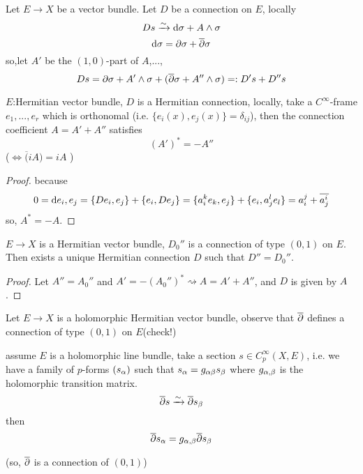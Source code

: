 
\begin{rem}Let $E\to X$ be a %
vector bundle.
Let $D$ be a connection on $E$, locally
$$Ds\xrightarrow{\sim}\mathrm{d}\sigma+A\wedge\sigma$$
$$\mathrm{d}\sigma=\partial\sigma+\overline{\partial}\sigma$$
so,let $A'$ be the $(1,0)$-part of $A$,...,
$$Ds=\partial\sigma+A'\wedge\sigma+(\overline{\partial}\sigma+A''\wedge\sigma)=:D's+D''s$$
\end{rem}

\begin{prop}
$E$:Hermitian vector bundle, $D$ is a Hermitian connection, locally,
take a $C^\infty$-frame $e_1,...,e_r$ which is orthonomal
(i.e. $\{e_i(x),e_j(x)\}=\delta_{ij}$), then the  connection coefficient
$A=A'+A''$ satisfies
$$(A')^*=-A''$$
($\iff \overline(iA)=iA$ )
\end{prop}

\begin{proof}
because
$$0=\mathrm{d}{e_i,e_j}=\{De_i,e_j\}+\{e_i,De_j\}
=\{a_i^ke_k,e_j\}+\{e_i,a_j^le_l\}
=a^j_i+\overline{a^i_j}$$
so, $A^*=-A$.
\end{proof}

\begin{cor}
$E\to X$ is a Hermitian vector bundle,
$D_0''$ is a connection of type $(0,1)$ on $E$.
Then exists a unique Hermitian connection $D$
such that $D''=D_0''$.
\end{cor}

\begin{proof}
Let $A''=A_0''$ and $A'=-(A_0'')^*\rightsquigarrow A=A'+A''$, and
$D$ is given by $A$.
\end{proof}

Let $E\to X$ is a holomorphic Hermitian vector bundle,
observe that $\overline{\partial}$ defines a connection of type $(0,1)$ on $E$(check!)

assume $E$ is a holomorphic line bundle, take a section
$s\in C_p^\infty(X,E)$, i.e. we have a family of $p$-forms $(s_\alpha)$
such that $s_\alpha=g_{\alpha\beta}s_\beta$
where $g_{\alpha,\beta}$ is the holomorphic transition matrix.
$$\overline{\partial} s\xrightarrow{\sim}\overline{\partial} s_\beta$$
then
$$\overline{\partial} s_\alpha=g_{\alpha,\beta}\overline{\partial} s_\beta$$

(so, $\overline{\partial}$ is a connection of $(0,1)$)

